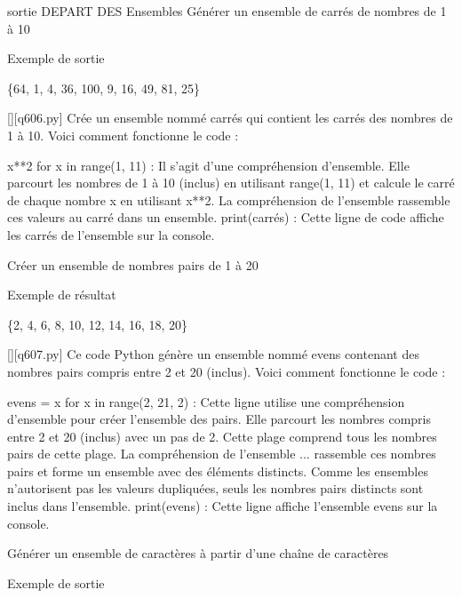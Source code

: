 sortie        \question
        DEPART DES Ensembles
Générer un ensemble de carrés de nombres de 1 à 10

Exemple de sortie

\{64, 1, 4, 36, 100, 9, 16, 49, 81, 25\}
        \par
        \begin{solution}
            \renewcommand{\nomfichier}{q606.py}
            \pythonfile{\chemincode \nomfichier}[][\nomfichier]
            Crée un ensemble nommé carrés qui contient les carrés des nombres de 1 à 10. Voici comment fonctionne le code :

    {x**2 for x in range(1, 11)} : Il s'agit d'une compréhension d'ensemble. Elle parcourt les nombres de 1 à 10 (inclus) en utilisant range(1, 11) et calcule le carré de chaque nombre x en utilisant x**2. La compréhension de l'ensemble rassemble ces valeurs au carré dans un ensemble.
    print(carrés) : Cette ligne de code affiche les carrés de l'ensemble sur la console.
        \end{solution}
        

        \question
        Créer un ensemble de nombres pairs de 1 à 20

Exemple de résultat

\{2, 4, 6, 8, 10, 12, 14, 16, 18, 20\}
        \par
        \begin{solution}
            \renewcommand{\nomfichier}{q607.py}
            \pythonfile{\chemincode \nomfichier}[][\nomfichier]
            Ce code Python génère un ensemble nommé evens contenant des nombres pairs compris entre 2 et 20 (inclus). Voici comment fonctionne le code :

    evens = {x for x in range(2, 21, 2)} : Cette ligne utilise une compréhension d'ensemble pour créer l'ensemble des pairs. Elle parcourt les nombres compris entre 2 et 20 (inclus) avec un pas de 2. Cette plage comprend tous les nombres pairs de cette plage.
    La compréhension de l'ensemble {...} rassemble ces nombres pairs et forme un ensemble avec des éléments distincts. Comme les ensembles n'autorisent pas les valeurs dupliquées, seuls les nombres pairs distincts sont inclus dans l'ensemble.
    print(evens) : Cette ligne affiche l'ensemble evens sur la console.
        \end{solution}
        

        \question
        Générer un ensemble de caractères à partir d'une chaîne de caractères

Exemple de sortie

